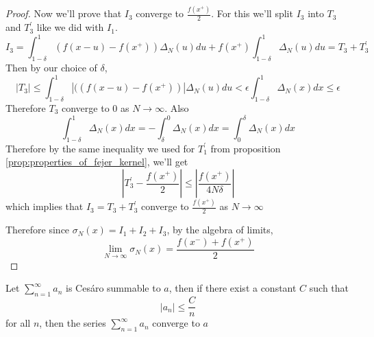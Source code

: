 \begin{proof}
    Now we'll prove that $I_3$ converge to $\frac{f(x^+)}{2}$. For this we'll split $I_3$ into $T_3$ and $T_3^{'}$ like we did with $I_1$. 
    $$I_3 = \int_{1-\delta}^1 (f(x-u) - f(x^+))\Delta_N(u) du + f(x^+)\int_{1-\delta}^{1}\Delta_N(u) du = T_3 + T_3^{'}$$
    Then by our choice of $\delta$, 
    $$|T_3| \le \int_{1-\delta}^1 |((f(x-u) - f(x^+))|\Delta_N(u)du < \epsilon \int_{1-\delta}^1 \Delta_N(x) dx \le \epsilon$$
    Therefore $T_3$ converge to $0$ as $N \to \infty$.
    Also
      $$\int_{1-\delta}^1 \Delta_N(x) dx = -\int_{\delta}^0 \Delta_N(x) dx = \int_0^\delta \Delta_N(x) dx$$
      Therefore by the same inequality we used for $T_1^{'}$ from proposition \ref{prop:properties_of_fejer_kernel}, we'll get
      $$ \left| T_3^{'} - \frac{f(x^+)}{2} \right| \le \left|\frac{f(x^+)}{4N\delta} \right|$$
      which implies that $I_3 = T_3 + T_3^{'}$ converge to $\frac{f(x^+)}{2}$ as $N \to \infty$

    Therefore since $\sigma_N(x) = I_1 + I_2 + I_3$, by the algebra of limits, 
    $$ \lim_{N \to \infty} \sigma_N(x) = \frac{f(x^-) + f(x^+)}{2}$$
  \end{proof}

 \begin{theorem}
   Let $\sum_{n=1}^\infty a_n$ is Ces\'aro summable to $a$, then if there exist a constant $C$ such that $$|a_n| \le \frac{C}{n}$$ for all $n$, then the series $\sum_{n=1}^\infty a_n$ converge to $a$
 \end{theorem}

